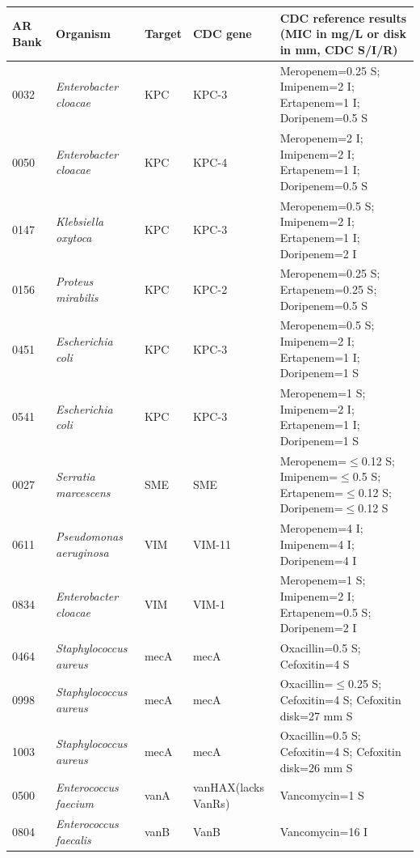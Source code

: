 \begin{tabularx}{\textwidth}{@{}llll>{\raggedright\arraybackslash}X@{}}
\toprule
AR Bank & Organism & Target & CDC gene & CDC reference results (MIC in mg/L or disk in mm, CDC S/I/R) \\
\midrule
0032 & \textit{Enterobacter cloacae} & KPC & KPC-3 & Meropenem=0.25 S; Imipenem=2 I; Ertapenem=1 I; Doripenem=0.5 S \\
0050 & \textit{Enterobacter cloacae} & KPC & KPC-4 & Meropenem=2 I; Imipenem=2 I; Ertapenem=1 I; Doripenem=0.5 S \\
0147 & \textit{Klebsiella oxytoca} & KPC & KPC-3 & Meropenem=0.5 S; Imipenem=2 I; Ertapenem=1 I; Doripenem=2 I \\
0156 & \textit{Proteus mirabilis} & KPC & KPC-2 & Meropenem=0.25 S; Ertapenem=0.25 S; Doripenem=0.5 S \\
0451 & \textit{Escherichia coli} & KPC & KPC-3 & Meropenem=0.5 S; Imipenem=2 I; Ertapenem=1 I; Doripenem=1 S \\
0541 & \textit{Escherichia coli} & KPC & KPC-3 & Meropenem=1 S; Imipenem=2 I; Ertapenem=1 I; Doripenem=1 S \\
0027 & \textit{Serratia marcescens} & SME & SME & Meropenem=$\le$0.12 S; Imipenem=$\le$0.5 S; Ertapenem=$\le$0.12 S; Doripenem=$\le$0.12 S \\
0611 & \textit{Pseudomonas aeruginosa} & VIM & VIM-11 & Meropenem=4 I; Imipenem=4 I; Doripenem=4 I \\
0834 & \textit{Enterobacter cloacae} & VIM & VIM-1 & Meropenem=1 S; Imipenem=2 I; Ertapenem=0.5 S; Doripenem=2 I \\
0464 & \textit{Staphylococcus aureus} & mecA & mecA & Oxacillin=0.5 S; Cefoxitin=4 S \\
0998 & \textit{Staphylococcus aureus} & mecA & mecA & Oxacillin=$\le$0.25 S; Cefoxitin=4 S; Cefoxitin disk=27 mm S \\
1003 & \textit{Staphylococcus aureus} & mecA & mecA & Oxacillin=0.5 S; Cefoxitin=4 S; Cefoxitin disk=26 mm S \\
0500 & \textit{Enterococcus faecium} & vanA & vanHAX(lacks VanRs) & Vancomycin=1 S \\
0804 & \textit{Enterococcus faecalis} & vanB & VanB & Vancomycin=16 I \\
\bottomrule
\end{tabularx}
